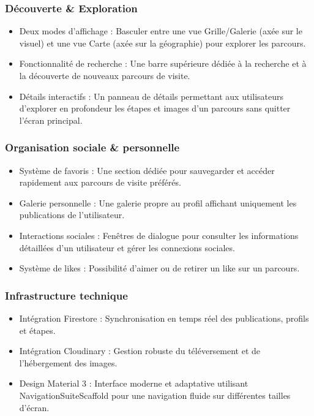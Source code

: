 \documentclass[a4paper, 12pt]{article}
\begin{document}
\begin{justify}
\subsubsection*{Découverte \& Exploration}
\begin{itemize}
    \item Deux modes d'affichage : Basculer entre une vue Grille/Galerie (axée sur le visuel) et une vue Carte (axée sur la géographie) pour explorer les parcours.
    \item Fonctionnalité de recherche : Une barre supérieure dédiée à la recherche et à la découverte de nouveaux parcours de visite.
    \item Détails interactifs : Un panneau de détails permettant aux utilisateurs d'explorer en profondeur les étapes et images d'un parcours sans quitter l'écran principal.
\end{itemize}

\subsubsection*{Organisation sociale \& personnelle}
\begin{itemize}
    \item Système de favoris : Une section dédiée pour sauvegarder et accéder rapidement aux parcours de visite préférés.
    \item Galerie personnelle : Une galerie propre au profil affichant uniquement les publications de l'utilisateur.
    \item Interactions sociales : Fenêtres de dialogue pour consulter les informations détaillées d'un utilisateur et gérer les connexions sociales.
    \item Système de likes : Possibilité d'aimer ou de retirer un like sur un parcours.
\end{itemize}

\subsubsection*{Infrastructure technique}
\begin{itemize}
    \item Intégration Firestore : Synchronisation en temps réel des publications, profils et étapes.
    \item Intégration Cloudinary : Gestion robuste du téléversement et de l'hébergement des images.
    \item Design Material 3 : Interface moderne et adaptative utilisant NavigationSuiteScaffold pour une navigation fluide sur différentes tailles d'écran.
\end{itemize}


\end{justify}
\end{document}

